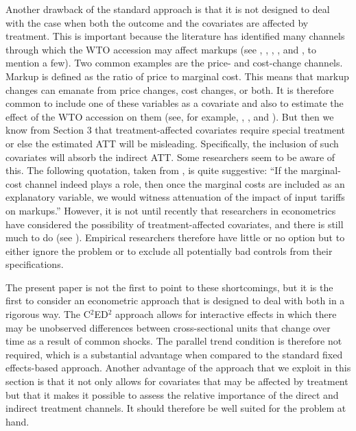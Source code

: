 \documentclass[12pt,fleqn]{article}
\begin{document}
Another drawback of the standard approach is that it is not designed to deal with the case when both the outcome and the covariates are affected by treatment. This is important because the literature has identified many channels through which the WTO accession may affect markups (see \citealp{Mao_Xu_2019}, \citealp{Fan_etal_2018}, \citealp{Deng_etal_2018}, \citealp{Liu_Ma_2021}, and \citealp{Brandt_etal_2017}, to mention a few). Two common examples are the price- and cost-change channels. Markup is defined as the ratio of price to marginal cost. This means that markup changes can emanate from price changes, cost changes, or both. It is therefore common to include one of these variables as a covariate and also to estimate the effect of the WTO accession on them (see, for example, \citealp{Mao_Xu_2019}, \citealp{Fan_etal_2018}, and \citealp{lu2015trade}). But then we know from Section 3 that treatment-affected covariates require special treatment or else the estimated ATT will be misleading. Specifically, the inclusion of such covariates will absorb the indirect ATT. Some researchers seem to be aware of this. The following quotation, taken from \citet[page 116]{Fan_etal_2018}, is quite suggestive: ``If the marginal-cost channel indeed plays a role, then once the marginal costs are included as an explanatory variable, we would witness attenuation of the impact of input tariffs on markups.'' However, it is not until recently that researchers in econometrics have considered the possibility of treatment-affected covariates, and there is still much to do (see \citealp{Caetano_Callaway_Payne_Rodrigues_2022}). Empirical researchers therefore have little or no option but to either ignore the problem or to exclude all potentially bad controls from their specifications.

The present paper is not the first to point to these shortcomings, but it is the first to consider an econometric approach that is designed to deal with both in a rigorous way. The C$^2$ED$^2$ approach allows for interactive effects in which there may be unobserved differences between cross-sectional units that change over time as a result of common shocks. The parallel trend condition is therefore not required, which is a substantial advantage when compared to the standard fixed effects-based approach. Another advantage of the approach that we exploit in this section is that it not only allows for covariates that may be affected by treatment but that it makes it possible to assess the relative importance of the direct and indirect treatment channels. It should therefore be well suited for the problem at hand.
\end{document}
